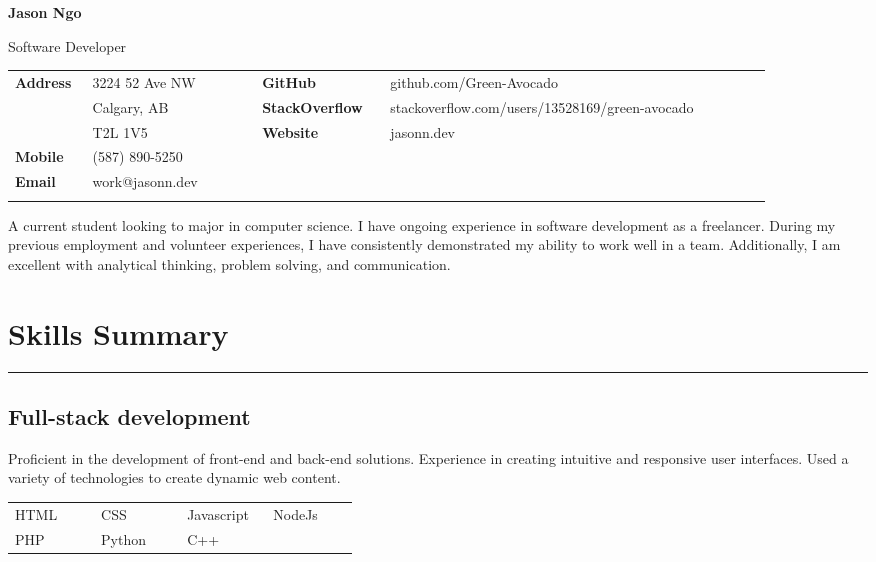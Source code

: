 \documentclass[letterpaper]{article}
\begin{document}
    {\Huge
    \textbf{Jason Ngo}}

    {\large
    Software Developer}

    {\small%
        \renewcommand{\arraystretch}{1.5}
        \begin{tabular}{p{0.08\linewidth} p{0.2\linewidth} p{0.15\linewidth} p{0.45\linewidth}}
            \\
            \textbf{Address} & 3224 52 Ave NW & \textbf{GitHub} & github.com/Green-Avocado \\
            & Calgary, AB & \textbf{StackOverflow} & stackoverflow.com/users/13528169/green-avocado \\
            & T2L 1V5 & \textbf{Website} & jasonn.dev \\
            \textbf{Mobile} & (587) 890-5250 \\
            \textbf{Email} & work@jasonn.dev \\
            \\
        \end{tabular}
    }

    A current student looking to major in computer science.
    I have ongoing experience in software development as a freelancer.
    During my previous employment and volunteer experiences, I have consistently demonstrated my ability to work well in a team.
    Additionally, I am excellent with analytical thinking, problem solving, and communication.

    \section*{Skills Summary}

        \rule{\linewidth}{0.2pt}

        \subsection*{Full-stack development}

        Proficient in the development of front-end and back-end solutions.
        Experience in creating intuitive and responsive user interfaces.
        Used a variety of technologies to create dynamic web content.

        \begin{center}
        \begin{tabular}{p{0.22\linewidth} p{0.22\linewidth} p{0.22\linewidth} p{0.22\linewidth}}
            HTML & CSS & Javascript & NodeJs \\
            PHP & Python & C++ &\\
        \end{tabular}
        \end{center}
\end{document}
